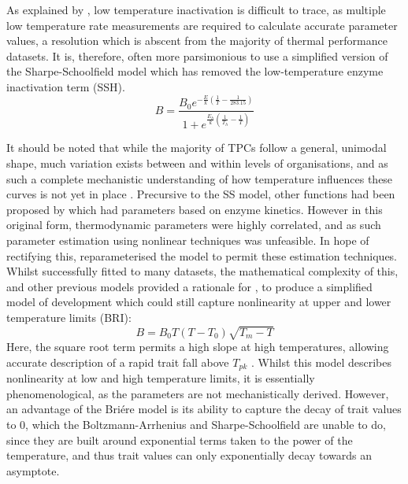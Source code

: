 \documentclass[11pt]{article}
\begin{document}
        As explained by \cite{kontopoulos2018use}, low temperature inactivation is difficult to trace, as multiple low temperature rate measurements are required to calculate accurate parameter values, a resolution which is abscent from the majority of thermal performance datasets. It is, therefore, often more parsimonious to use a simplified version of the Sharpe-Schoolfield model \cite{alber1993new} which has removed the low-temperature enzyme inactivation term (SSH).
        \begin{equation}
            B = \frac{B_{0}e^{-\frac{E}{k}(\frac{1}{T}-\frac{1}{283.15})}}{1 + e^{\frac{E_h}{k}(\frac{1}{T_h}-\frac{1}{T})}}
        \end{equation}
        
        It should be noted that while the majority of TPCs follow a general, unimodal shape, much variation exists between and within levels of organisations, and as such a complete mechanistic understanding of how temperature influences these curves is not yet in place \cite{schulte2015effects, delong2017combined}.
        Precursive to the SS model, other functions had been proposed by \cite{sharpe1977reaction} which had parameters based on enzyme kinetics. However in this original form, thermodynamic parameters were highly correlated, and as such parameter estimation using nonlinear techniques was unfeasible. In hope of rectifying this, \cite{schoolfield1981non} reparameterised the \cite{sharpe1977reaction} model to permit these estimation techniques. Whilst successfully fitted to many datasets, the mathematical complexity of this, and other previous models  provided a rationale for , to produce a simplified model of development which could still capture nonlinearity at upper and lower temperature limits (BRI):
        \begin{equation}
            B = B_{0}T(T - T_{0})\sqrt{T_{m} - T}
        \end{equation}
        Here, the square root term permits a high slope at high temperatures, allowing accurate description of a rapid trait fall above $T_{pk}$ . Whilst this model describes nonlinearity at low and high temperature limits, it is essentially phenomenological, as the parameters are not mechanistically derived. However, an advantage of the Bri\'ere model is its ability to capture the decay of trait values to 0, which the Boltzmann-Arrhenius and Sharpe-Schoolfield are unable to do, since they are built around exponential terms taken to the power of the temperature, and thus trait values can only exponentially decay towards an asymptote.
\end{document}
